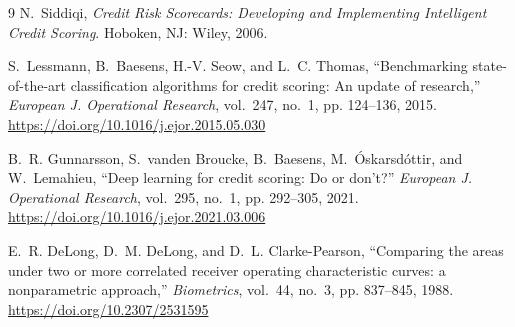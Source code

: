 \documentclass[a4paper,twocolumn,10pt]{article}
\begin{document}
\begin{thebibliography}{9}
\small
{}
N.~Siddiqi, \textit{Credit Risk Scorecards: Developing and Implementing Intelligent Credit Scoring}. Hoboken, NJ: Wiley, 2006.

S.~Lessmann, B.~Baesens, H.-V. Seow, and L.~C. Thomas, ``Benchmarking state-of-the-art classification algorithms for credit scoring: An update of research,'' \textit{European J. Operational Research}, vol.~247, no.~1, pp. 124--136, 2015. \url{https://doi.org/10.1016/j.ejor.2015.05.030}

B.~R. Gunnarsson, S.~vanden Broucke, B.~Baesens, M.~\'Oskarsd\'ottir, and W.~Lemahieu, ``Deep learning for credit scoring: Do or don't?'' \textit{European J. Operational Research}, vol.~295, no.~1, pp. 292--305, 2021. \url{https://doi.org/10.1016/j.ejor.2021.03.006}

E.~R. DeLong, D.~M. DeLong, and D.~L. Clarke-Pearson, ``Comparing the areas under two or more correlated receiver operating characteristic curves: a nonparametric approach,'' \textit{Biometrics}, vol.~44, no.~3, pp. 837--845, 1988. \url{https://doi.org/10.2307/2531595}
\end{thebibliography}
\end{document}
